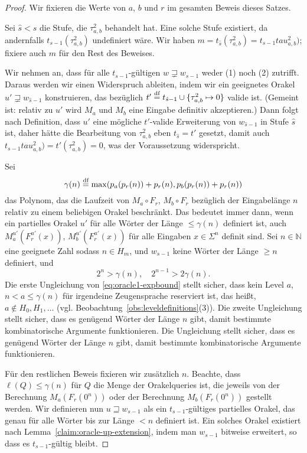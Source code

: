 \begin{proof}
Wir fixieren die Werte von $a$, $b$ und $r$ im gesamten Beweis dieses Satzes.

Sei $\hat{s} < s$ die Stufe, die $\tau^2_{a,b}$ behandelt hat.
Eine solche Stufe existiert, da andernfalls $t_{s-1}(\tau^2_{a,b})$ undefiniert wäre.
Wir haben $m = t_{\hat{s}}(\tau^2_{a,b}) = t_{s-1}tau^2_{a,b})$; fixiere auch $m$ für den Rest des Beweises.

Wir nehmen an, dass für alle $t_{s-1}$-gültigen $w\sqsupsetneq w_{s-1}$ weder (1) noch (2) zutrifft.
Daraus werden wir einen Widerspruch ableiten, indem wir ein geeignetes Orakel $u'\sqsupsetneq w_{\hat{s}-1}$ konstruieren, das bezüglich $t' \stackrel{\text{df}}{=}  t_{\hat{s}-1}\cup \{\tau^2_{a,b}\mapsto 0\}$ valide ist. (Gemeint ist: relativ zu $u'$ wird $M_a$ und $M_b$ eine Eingabe definitiv akzeptieren.)
Dann folgt nach Definition, dass $u'$ eine mögliche $t'$-valide Erweiterung von $w_{\hat{s}-1}$ in Stufe $\hat{s}$ ist, daher hätte die Bearbeitung von $\tau^2_{a,b}$ eben $t_{\hat{s}}=t'$ gesetzt, damit auch $t_{s-1}tau^2_{a,b})=t'(\tau^2_{a,b})=0$, was der Voraussetzung widerspricht.

Sei
\begin{equation*} \gamma(n) \stackrel{\text{df}}{=}  \max(p_a(p_r(n))+p_r(n), p_b(p_r(n))+p_r(n)) \end{equation*}
das Polynom, das die Laufzeit von $M_a\circ F_r$, $M_b\circ F_r$ bezüglich der Eingabelänge $n$ relativ zu einem beliebigen Orakel beschränkt.
Das bedeutet immer dann, wenn ein partielles Orakel $u'$ für alle Wörter der Länge $\leq \gamma(n)$ definiert ist, auch $M_a^{u'}(F_r^{u'}(x))$, $M_b^{u'}(F_r^{u'}(x))$ für alle Eingaben $x\in\Sigma^n$ definit sind.
Sei $n\in\mathbb N$ eine geeignete Zahl sodass $n\in H_m$, und $w_{s-1}$ keine Wörter der Länge $\geq n$ definiert,
und
\begin{equation}\label{eq:oracle1-expbound}
    2^n > \gamma(n),\quad  2^{n-1} > 2\gamma(n).
\end{equation}
Die erste Ungleichung von \eqref{eq:oracle1-expbound} stellt sicher, dass kein Level $a$, $n<a\leq \gamma(n)$ für irgendeine Zeugensprache reserviert ist, das heißt, $a\not\in H_0, H_1, \dots$ (vgl. Beobachtung~\ref{obs:leveldefinitions}(3)). Die zweite Ungleichung stellt sicher, dass es genügend Wörter der Länge $n$ gibt, damit bestimmte kombinatorische Argumente funktionieren.
Die Ungleichung stellt sicher, dass es genügend Wörter der Länge $n$ gibt, damit bestimmte kombinatorische Argumente funktionieren.

Für den restlichen Beweis fixieren wir zusätzlich $n$.
Beachte, dass $\ell(Q)\leq\gamma(n)$ für $Q$ die Menge der Orakelqueries ist, die jeweils von der Berechnung $M_a(F_r(0^n))$ oder der Berechnung $M_b(F_r(0^n))$ gestellt werden.
Wir definieren nun $u\sqsupseteq w_{s-1}$ als ein $t_{s-1}$-gültiges partielles Orakel, das genau für alle Wörter bis zur Länge $<n$ definiert ist. Ein solches Orakel existiert nach Lemma~\ref{claim:oracle-up-extension}, indem man $w_{s-1}$ bitweise erweitert, so dass es $t_{s-1}$-gültig bleibt.


\end{proof}

